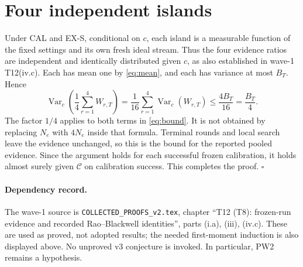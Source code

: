 \documentclass[11pt]{article}
\newcommand{\Vc}{\operatorname{Var}_c}
\begin{document}
\section{Four independent islands}
Under CAL and EX-S, conditional on $c$, each island is a measurable
function of the fixed settings and its own fresh ideal stream. Thus the
four evidence ratios are independent and identically distributed given
$c$, as also established in wave-1 T12(iv.c). Each has mean one by
\eqref{eq:mean}, and each has variance at most $B_T$. Hence
\[
 \Vc\!\left(\frac14\sum_{r=1}^4W_{r,T}\right)
 =\frac1{16}\sum_{r=1}^4\Vc(W_{r,T})
 \le\frac{4B_T}{16}=\frac{B_T}{4}.
\]
The factor $1/4$ applies to both terms in \eqref{eq:bound}.
It is not obtained by replacing $N_e$ with $4N_e$ inside that formula.
Terminal rounds and local search leave the evidence unchanged, so this
is the bound for the reported pooled evidence. Since the argument holds
for each successful frozen calibration, it holds almost surely given
$\mathcal C$ on calibration success. This completes the proof.
\hfill$\square$

\paragraph{Dependency record.}
The wave-1 source is \texttt{COLLECTED\_PROOFS\_v2.tex}, chapter
``T12 (T8): frozen-run evidence and recorded Rao--Blackwell identities'',
parts (i.a), (iii), (iv.c). These are used as proved, not adopted results;
the needed first-moment induction is also displayed above. No unproved
v3 conjecture is invoked. In particular, PW2 remains a hypothesis.
\end{document}
